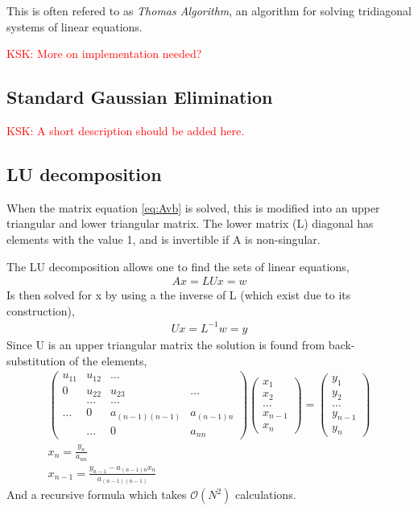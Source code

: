 \documentclass[11pt,a4paper,english,draft]{article}
\numberwithin{equation}{section}
\newcommand{\bigO}[1]{\mathcal{O}\left( #1 \right)}
\begin{document}
This is often refered to as \emph{Thomas Algorithm}, an algorithm for solving tridiagonal systems of linear equations. 

\textcolor{red}{KSK: More on implementation needed?}

\subsection{Standard Gaussian Elimination}


\textcolor{red}{KSK: A short description should be added here. }

\subsection{LU decomposition}

When the matrix equation \eqref{eq:Avb} is solved, this is modified into
an upper triangular and lower triangular matrix. The lower matrix (L) 
diagonal has elements with the value 1, and is invertible if A is 
non-singular.

The LU decomposition allows one to find the sets of linear equations,
\begin{gather}
Ax = LUx = w
\end{gather}
Is then solved for x by using a the inverse of L (which exist due to its 
construction), 
\begin{gather}
Ux = L^{-1}w = y
\end{gather}
Since U is an upper triangular matrix the solution is found from back-substitution
of the elements,
\begin{gather}
\begin{pmatrix} u_{11} & u_{12} & \dots\\
                0 & u_{22} & u_{23} & \dots\\
                &\dots & \dots\\
                \dots & 0 & a_{(n-1)(n-1)} & a_{(n-1)n} \\
                & \dots & 0 & a_{nn}
\end{pmatrix} \begin{pmatrix} x_1 \\ x_2 \\ \dots \\ x_{n-1}\\ x_n \end{pmatrix}
 = \begin{pmatrix} y_1 \\ y_2 \\ \dots\\ y_{n-1} \\ y_n \end{pmatrix}\\
 x_n = \frac{y_n}{a_{nn}}\\
 x_{n-1} = \frac{y_{n-1} - a_{(n-1)n}x_n}{a_{(n-1)(n-1)}}
\end{gather}
And a recursive formula which takes $\bigO{N^2}$ calculations.
\end{document}
